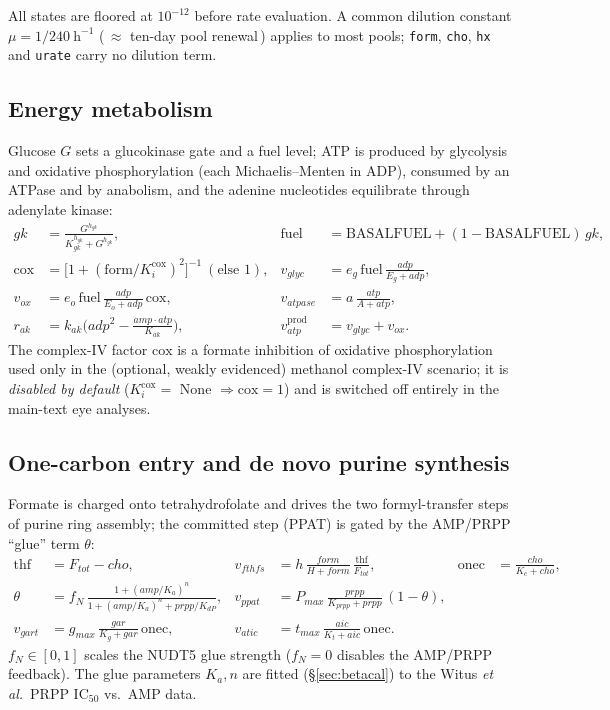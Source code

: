 \documentclass[11pt]{article}
\begin{document}
All states are floored at $10^{-12}$ before rate evaluation. A common dilution
constant $\mu = 1/240~\mathrm{h^{-1}}$ (\,$\approx$ ten-day pool renewal\,) applies
to most pools; \texttt{form}, \texttt{cho}, \texttt{hx} and \texttt{urate} carry no
dilution term.

\subsection{Energy metabolism}
Glucose $G$ sets a glucokinase gate and a fuel level; ATP is produced by
glycolysis and oxidative phosphorylation (each Michaelis--Menten in ADP), consumed
by an ATPase and by anabolism, and the adenine nucleotides equilibrate through
adenylate kinase:
\begin{align}
gk &= \frac{G^{h_{gk}}}{K_{gk}^{h_{gk}}+G^{h_{gk}}}, &
\mathrm{fuel} &= \mathrm{BASALFUEL}+(1-\mathrm{BASALFUEL})\,gk,\\
\mathrm{cox} &= \Big[1+(\mathrm{form}/K_i^{\mathrm{cox}})^2\Big]^{-1}\ (\text{else }1), &
v_{glyc} &= e_g\,\mathrm{fuel}\,\frac{adp}{E_g+adp},\\
v_{ox} &= e_o\,\mathrm{fuel}\,\frac{adp}{E_o+adp}\,\mathrm{cox}, &
v_{atpase} &= a\,\frac{atp}{A+atp},\\
r_{ak} &= k_{ak}\Big(adp^2-\frac{amp\cdot atp}{K_{ak}}\Big), &
v_{atp}^{\mathrm{prod}} &= v_{glyc}+v_{ox}.
\end{align}
The complex-IV factor $\mathrm{cox}$ is a formate inhibition of oxidative
phosphorylation used only in the (optional, weakly evidenced) methanol
complex-IV scenario; it is \emph{disabled by default} ($K_i^{\mathrm{cox}}=$ None
$\Rightarrow \mathrm{cox}=1$) and is switched off entirely in the main-text eye
analyses.

\subsection{One-carbon entry and de novo purine synthesis}
Formate is charged onto tetrahydrofolate and drives the two formyl-transfer steps
of purine ring assembly; the committed step (PPAT) is gated by the AMP/PRPP
``glue'' term $\theta$:
\begin{align}
\mathrm{thf}&=F_{tot}-cho, &
v_{fthfs}&=h\,\tfrac{form}{H+form}\,\tfrac{\mathrm{thf}}{F_{tot}}, &
\mathrm{onec}&=\tfrac{cho}{K_c+cho},\\
\theta&=f_N\,\tfrac{1+(amp/K_a)^{n}}{1+(amp/K_a)^{n}+prpp/K_{dP}}, &
v_{ppat}&=P_{max}\,\tfrac{prpp}{K_{prpp}+prpp}\,(1-\theta),\\
v_{gart}&=g_{max}\,\tfrac{gar}{K_g+gar}\,\mathrm{onec}, &
v_{atic}&=t_{max}\,\tfrac{aic}{K_t+aic}\,\mathrm{onec}.
\end{align}
$f_N\in[0,1]$ scales the NUDT5 glue strength ($f_N=0$ disables the AMP/PRPP
feedback). The glue parameters $K_a,n$ are fitted (\S\ref{sec:betacal}) to the
Witus \textit{et al.}\ PRPP IC$_{50}$ vs.\ AMP data.
\end{document}
